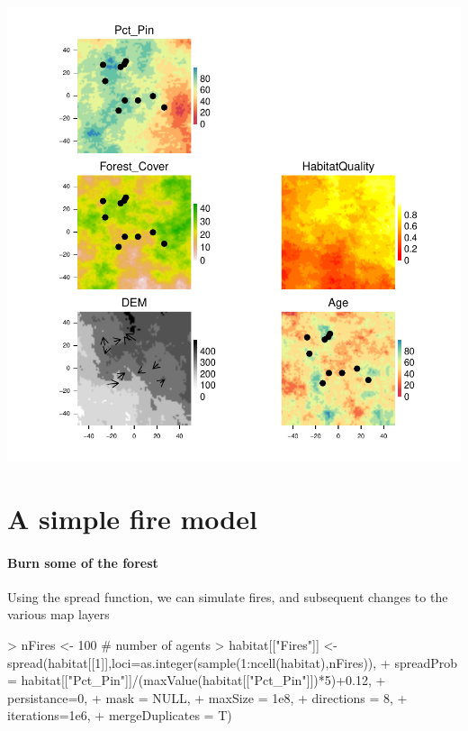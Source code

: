\documentclass{article}
\begin{document}
\includegraphics{introduction-mobile-point-agent}

\section{A simple fire model}

\paragraph{Burn some of the forest}
Using the spread function, we can simulate fires, and subsequent changes to the various map layers
\begin{Schunk}
\begin{Sinput}
> nFires <- 100 # number of agents
> habitat[["Fires"]] <- spread(habitat[[1]],loci=as.integer(sample(1:ncell(habitat),nFires)),
+                              spreadProb = habitat[["Pct_Pin"]]/(maxValue(habitat[["Pct_Pin"]])*5)+0.12,
+                              persistance=0,
+                              mask = NULL,
+                              maxSize = 1e8,
+                              directions = 8,
+                              iterations=1e6,
+                              mergeDuplicates = T)
\end{Sinput}
\end{Schunk}
\end{document}
